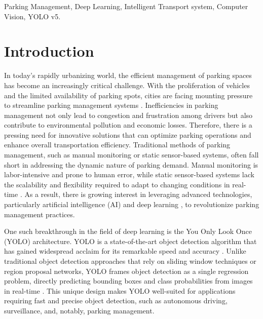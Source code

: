 \documentclass[conference]{IEEEtran}
\begin{document}
\begin{IEEEkeywords}
Parking Management, Deep Learning, Intelligent Transport system, Computer Vision, YOLO v5.
\end{IEEEkeywords}

\section{Introduction}\label{sec1}

In today's rapidly urbanizing world, the efficient management of parking spaces has become an increasingly critical challenge. With the proliferation of vehicles and the limited availability of parking spots, cities are facing mounting pressure to streamline parking management systems \cite{ramasamy2021fuzzy}. Inefficiencies in parking management not only lead to congestion and frustration among drivers but also contribute to environmental pollution and economic losses. Therefore, there is a pressing need for innovative solutions that can optimize parking operations and enhance overall transportation efficiency\cite{madhavi2023hybrid}. Traditional methods of parking management, such as manual monitoring or static sensor-based systems, often fall short in addressing the dynamic nature of parking demand. Manual monitoring is labor-intensive and prone to human error, while static sensor-based systems lack the scalability and flexibility required to adapt to changing conditions in real-time \cite{sudhakar2022improved}. As a result, there is growing interest in leveraging advanced technologies, particularly artificial intelligence (AI) and deep learning \cite{muthurajkumar2023swincnn,praveen2023secure}, to revolutionize parking management practices.

One such breakthrough in the field of deep learning is the You Only Look Once (YOLO) architecture. YOLO is a state-of-the-art object detection algorithm that has gained widespread acclaim for its remarkable speed and accuracy \cite{ganapathy2024intelligent,jagatheswari2022improved}. Unlike traditional object detection approaches that rely on sliding window techniques or region proposal networks, YOLO frames object detection as a single regression problem, directly predicting bounding boxes and class probabilities from images in real-time \cite{vijayakumar2024yolo,Muthurajkumar2023}. This unique design makes YOLO well-suited for applications requiring fast and precise object detection, such as autonomous driving, surveillance, and, notably, parking management.
\end{document}
